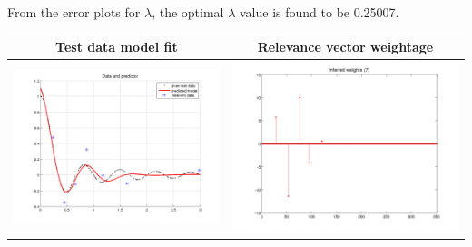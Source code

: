 \documentclass[fleqn]{article}
\begin{document}
From the error plots for $\lambda$, the optimal $\lambda$ value is found to be 0.25007.\\

\begin{center}
  \begin{longtable}{ c | c }
	\multicolumn{1}{c}{Test data model fit} & 
	\multicolumn{1}{c}{Relevance vector weightage}  \\
    \hline
    \includegraphics[scale=0.4]{./pics/task5/rvc_test_predicted_lambda=0.25007.png}  & \includegraphics[scale=0.4]{./pics/task5/rvc_weights_lambda=0.25007.png} \\
    \hline
  \end{longtable}
\end{center}
\end{document}
